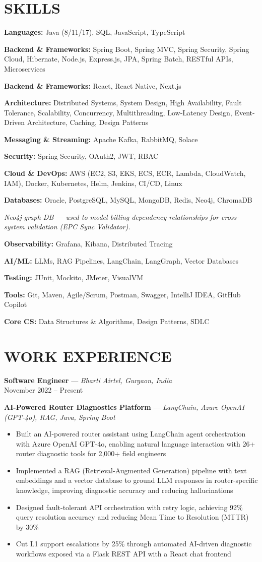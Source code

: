 \documentclass[10.5pt,letterpaper]{article}
\newcommand{\role}[3]{\textbf{\large #1} \hspace{0.4em}---\hspace{0.4em} \textit{#2}\\[-1pt]{\color{greytxt}\small #3}\par\vspace{2pt}}
\newcommand{\proj}[2]{\vspace{3pt}\textbf{#1} \hspace{0.3em}---\hspace{0.3em} \textit{#2}\par\vspace{-1pt}}
\newenvironment{bul}{\begin{itemize}[leftmargin=2.2em,itemsep=1pt,topsep=1pt,parsep=0pt,label=\textbullet]}{\end{itemize}}
\newcommand{\skill}[2]{\textbf{#1:} #2\par}
\begin{document}
\section{SKILLS}
\skill{Languages}{Java (8/11/17), SQL, JavaScript, TypeScript}
\skill{Backend \& Frameworks}{Spring Boot, Spring MVC, Spring Security, Spring Cloud, Hibernate, Node.js, Express.js, JPA, Spring Batch, RESTful APIs, Microservices}
\skill{Backend \& Frameworks}{React, React Native, Next.js}
\skill{Architecture}{Distributed Systems, System Design, High Availability, Fault Tolerance, Scalability, Concurrency, Multithreading, Low-Latency Design, Event-Driven Architecture, Caching, Design Patterns}
\skill{Messaging \& Streaming}{Apache Kafka, RabbitMQ, Solace}
\skill{Security}{Spring Security, OAuth2, JWT, RBAC}
\skill{Cloud \& DevOps}{AWS (EC2, S3, EKS, ECS, ECR, Lambda, CloudWatch, IAM), Docker, Kubernetes, Helm, Jenkins, CI/CD, Linux}
\skill{Databases}{Oracle, PostgreSQL, MySQL, MongoDB, Redis, Neo4j, ChromaDB}
{\itshape\small\color{greytxt} Neo4j graph DB --- used to model billing dependency relationships for cross-system validation (EPC Sync Validator).}\par
\skill{Observability}{Grafana, Kibana, Distributed Tracing}
\skill{AI/ML}{LLMs, RAG Pipelines, LangChain, LangGraph, Vector Databases}
\skill{Testing}{JUnit, Mockito, JMeter, VisualVM}
\skill{Tools}{Git, Maven, Agile/Scrum, Postman, Swagger, IntelliJ IDEA, GitHub Copilot}
\skill{Core CS}{Data Structures \& Algorithms, Design Patterns, SDLC}

\section{WORK EXPERIENCE}
\role{Software Engineer}{Bharti Airtel, Gurgaon, India}{November 2022 -- Present}

\proj{AI-Powered Router Diagnostics Platform}{LangChain, Azure OpenAI (GPT-4o), RAG, Java, Spring Boot}
\begin{bul}
\item Built an AI-powered router assistant using LangChain agent orchestration with Azure OpenAI GPT-4o, enabling natural language interaction with 26+ router diagnostic tools for 2,000+ field engineers
\item Implemented a RAG (Retrieval-Augmented Generation) pipeline with text embeddings and a vector database to ground LLM responses in router-specific knowledge, improving diagnostic accuracy and reducing hallucinations
\item Designed fault-tolerant API orchestration with retry logic, achieving 92\% query resolution accuracy and reducing Mean Time to Resolution (MTTR) by 30\%
\item Cut L1 support escalations by 25\% through automated AI-driven diagnostic workflows exposed via a Flask REST API with a React chat frontend
\end{bul}
\end{document}
